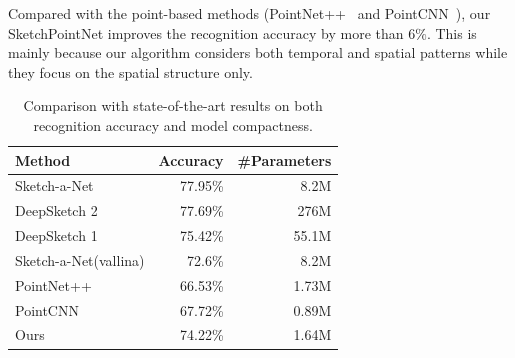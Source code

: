 Compared with the point-based methods (PointNet++~\cite{qi2017pointnetplusplus} and PointCNN~\cite{1801.07791}), our SketchPointNet improves the recognition accuracy by more than $6\%$.
This is mainly because our algorithm considers both temporal and spatial patterns while they focus on the spatial structure only.



\begin{table}[htbp]
\centering
\caption{Comparison with state-of-the-art results on both recognition accuracy and model compactness.}
\label{tb:acc-size}
\begin{tabular}{l|rr}
    \hline
     Method & Accuracy & \#Parameters\\
    \hline
     Sketch-a-Net \cite{Yu2015SketchaNetTB}& 77.95\%  & 8.2M\\
     DeepSketch 2 \cite{Dupont2016DeepSketch2D}& 77.69\%  & 276M\\
     \hline
     DeepSketch 1 \cite{Seddati2015DeepSketchDC}& 75.42\%  & 55.1M\\
     Sketch-a-Net(vallina) \cite{Yu2015SketchaNetTB}& 72.6\% & 8.2M \\
     \hline
     PointNet++ \cite{qi2017pointnetplusplus}& 66.53\%  & 1.73M\\
     PointCNN \cite{1801.07791}& 67.72\%  & 0.89M\\
     \hline
     Ours& 74.22\%  & 1.64M\\
    \hline
\end{tabular}
\end{table}


